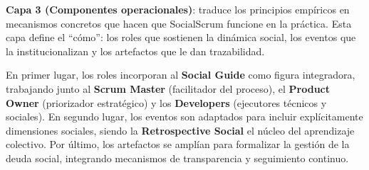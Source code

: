 \FloatBarrier

\textbf{Capa 3 (Componentes operacionales)}: traduce los principios empíricos en mecanismos concretos que hacen que SocialScrum funcione en la práctica.
Esta capa define el ``cómo'': los roles que sostienen la dinámica social, los eventos que la institucionalizan y los artefactos que le dan trazabilidad.

En primer lugar, los roles incorporan al \textbf{Social Guide} como figura integradora, trabajando junto al \textbf{Scrum Master} (facilitador del proceso), el \textbf{Product Owner} (priorizador estratégico) y los \textbf{Developers} (ejecutores técnicos y sociales).
En segundo lugar, los eventos son adaptados para incluir explícitamente dimensiones sociales, siendo la \textbf{Retrospective Social} el núcleo del aprendizaje colectivo.
Por último, los artefactos se amplían para formalizar la gestión de la deuda social, integrando mecanismos de transparencia y seguimiento continuo.

